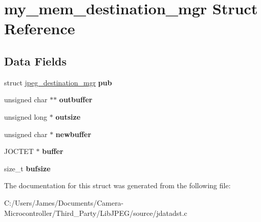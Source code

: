 \hypertarget{structmy__mem__destination__mgr}{}\section{my\+\_\+mem\+\_\+destination\+\_\+mgr Struct Reference}
\label{structmy__mem__destination__mgr}
\subsection*{Data Fields}
\begin{DoxyCompactItemize}
\item 
\mbox{\label{structmy__mem__destination__mgr_a755405c3ce0d3ee7efdd305bf2b5995d}} 
struct \hyperlink{structjpeg__destination__mgr}{jpeg\+\_\+destination\+\_\+mgr} {\bfseries pub}
\item 
\mbox{\label{structmy__mem__destination__mgr_a41ded6c3d7ffa6c759f426a583de6bc3}} 
unsigned char $\ast$$\ast$ {\bfseries outbuffer}
\item 
\mbox{\label{structmy__mem__destination__mgr_aba9f54a6e59a6b104f5cb55f0af8a695}} 
unsigned long $\ast$ {\bfseries outsize}
\item 
\mbox{\label{structmy__mem__destination__mgr_ac93a7f1248e64735c8636bd63563196a}} 
unsigned char $\ast$ {\bfseries newbuffer}
\item 
\mbox{\label{structmy__mem__destination__mgr_ab52519326423db6890165ce4f4d3d818}} 
J\+O\+C\+T\+ET $\ast$ {\bfseries buffer}
\item 
\mbox{\label{structmy__mem__destination__mgr_aa228557f03b26a638d3beae5da93f530}} 
size\+\_\+t {\bfseries bufsize}
\end{DoxyCompactItemize}


The documentation for this struct was generated from the following file\+:\begin{DoxyCompactItemize}
\item 
C\+:/\+Users/\+James/\+Documents/\+Camera-\/\+Microcontroller/\+Third\+\_\+\+Party/\+Lib\+J\+P\+E\+G/source/jdatadst.\+c\end{DoxyCompactItemize}
